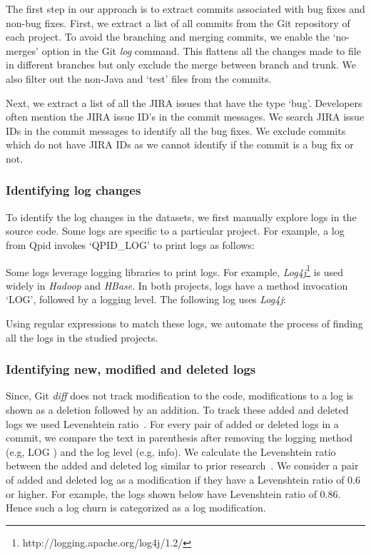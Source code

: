 The first step in our approach is to extract commits associated with bug fixes and non-bug fixes. First, we extract a list of all commits from the Git repository of each project. To avoid the branching and merging commits, we enable the `no-merges' option in the Git \textsl{log} command. This flattens all the changes made to file in different branches but only exclude the merge between branch and trunk. We also filter out the non-Java and `test' files from the commits. 

Next, we extract a list of all the JIRA issues that have the type `bug'. Developers often mention the JIRA issue ID's in the commit messages. We search JIRA issue IDs in the commit messages to identify all the bug fixes. We exclude commits which do not have JIRA IDs as we cannot identify if the commit is a bug fix or not. 

\subsubsection{Identifying log changes}


To identify the log changes in the datasets, we first manually explore logs in the source code. Some logs are specific to a particular project. For example, a log from Qpid invokes `QPID\_LOG' to print logs as follows: 

Some logs leverage logging libraries to print logs. For example, \textsl{Log4j}\footnote{http://logging.apache.org/log4j/1.2/} is used widely in \emph{Hadoop} and \emph{HBase}. In both projects, logs have a method invocation `LOG', followed by a logging level. The following log uses \textsl{Log4j}:

Using regular expressions to match these logs, we automate the process of finding all the logs in the studied projects.


\subsubsection{Identifying new, modified and deleted logs}

Since, Git \textsl{diff} does not track modification to the code, modifications to a log is shown as a deletion followed by an addition. To track these added and deleted logs we used Levenshtein ratio~\cite{Levenshtein2}. For every pair of added or deleted logs in a commit, we compare the text in parenthesis after removing the logging method (e.g, LOG ) and the log level (e.g, info). We calculate the Levenshtein ratio between the added and deleted log similar to prior research~\cite{levenshteinratio}. We consider a pair of added and deleted log as a modification if they have a Levenshtein ratio of 0.6 or higher. For example, the logs shown below have Levenshtein ratio of 0.86. Hence such a log churn is categorized as a log modification.  

